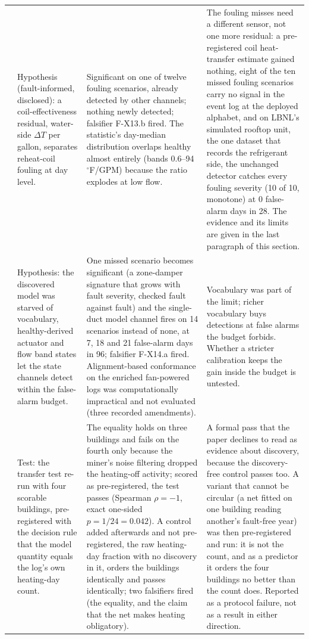 \documentclass[11pt,letterpaper]{article}
\begin{document}
{\begin{longtable}{@{}>{\raggedright\arraybackslash}p{}>{\raggedright\arraybackslash}p{}>{\raggedright\arraybackslash}p{}>{\raggedright\arraybackslash}p{}@{}}
8 & Hypothesis (fault-informed, disclosed): a coil-effectiveness residual, water-side $\Delta T$ per gallon, separates reheat-coil fouling at day level. & Significant on one of twelve fouling scenarios, already detected by other channels; nothing newly detected; falsifier F-X13.b fired. The statistic's day-median distribution overlaps healthy almost entirely (bands 0.6--94 $^\circ$F/GPM) because the ratio explodes at low flow. & The fouling misses need a different sensor, not one more residual: a pre-registered coil heat-transfer estimate gained nothing, eight of the ten missed fouling scenarios carry no signal in the event log at the deployed alphabet, and on LBNL's simulated rooftop unit, the one dataset that records the refrigerant side, the unchanged detector catches every fouling severity (10 of 10, monotone) at 0 false-alarm days in 28. The evidence and its limits are given in the last paragraph of this section. \\
9 & Hypothesis: the discovered model was starved of vocabulary, healthy-derived actuator and flow band states let the state channels detect within the false-alarm budget. & One missed scenario becomes significant (a zone-damper signature that grows with fault severity, checked fault against fault) and the single-duct model channel fires on 14 scenarios instead of none, at 7, 18 and 21 false-alarm days in 96; falsifier F-X14.a fired. Alignment-based conformance on the enriched fan-powered logs was computationally impractical and not evaluated (three recorded amendments). & Vocabulary was part of the limit; richer vocabulary buys detections at false alarms the budget forbids. Whether a stricter calibration keeps the gain inside the budget is untested. \\
10 & Test: the transfer test re-run with four scorable buildings, pre-registered with the decision rule that the model quantity equals the log's own heating-day count. & The equality holds on three buildings and fails on the fourth only because the miner's noise filtering dropped the heating-off activity; scored as pre-registered, the test passes (Spearman $\rho=-1$, exact one-sided $p = 1/24 = 0.042$). A control added afterwards and not pre-registered, the raw heating-day fraction with no discovery in it, orders the buildings identically and passes identically; two falsifiers fired (the equality, and the claim that the net makes heating obligatory). & A formal pass that the paper declines to read as evidence about discovery, because the discovery-free control passes too. A variant that cannot be circular (a net fitted on one building reading another's fault-free year) was then pre-registered and run: it is not the count, and as a predictor it orders the four buildings no better than the count does. Reported as a protocol failure, not as a result in either direction. \\
\hline
\end{longtable}}
\end{document}
